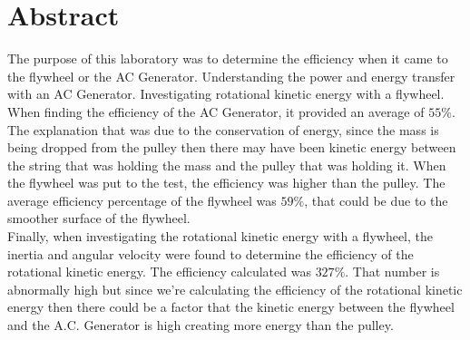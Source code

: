 \documentclass[11pt]{article}
\begin{document}
\section*{Abstract}
The purpose of this laboratory was to determine the efficiency when it came to the flywheel or the AC Generator. Understanding the power and energy transfer with an AC Generator. Investigating rotational kinetic energy with a flywheel. When finding the efficiency of the AC Generator, it provided an average of $55\%$. The explanation that was due to the conservation of energy, since the mass is being dropped from the pulley then there may have been kinetic energy between the string that was holding the mass and the pulley that was holding it. When the flywheel was put to the test, the efficiency was higher than the pulley. The average efficiency percentage of the flywheel was $59\%$, that could be due to the smoother surface of the flywheel.\\
Finally, when investigating the rotational kinetic energy with a flywheel, the inertia and angular velocity were found to determine the efficiency of the rotational kinetic energy. The efficiency calculated was $327\%$. That number is abnormally high but since we're calculating the efficiency of the rotational kinetic energy then there could be a factor that the kinetic energy between the flywheel and the A.C. Generator is high creating more energy than the pulley.
\end{document}

